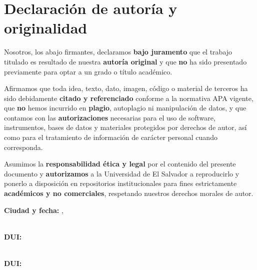\chapter*{Declaración de autoría y originalidad}

Nosotros, los abajo firmantes, declaramos \textbf{bajo juramento} que el trabajo titulado
\textit{\UEStitle} es resultado de nuestra \textbf{autoría original} y que \textbf{no} ha sido
presentado previamente para optar a un grado o título académico.

Afirmamos que toda idea, texto, dato, imagen, código o material de terceros ha sido
debidamente \textbf{citado y referenciado} conforme a la normativa APA vigente, que \textbf{no}
hemos incurrido en \textbf{plagio}, autoplagio ni manipulación de datos, y que contamos con las
\textbf{autorizaciones} necesarias para el uso de software, instrumentos, bases de datos y
materiales protegidos por derechos de autor, así como para el tratamiento de información de
carácter personal cuando corresponda.

Asumimos la \textbf{responsabilidad ética y legal} por el contenido del presente documento y
\textbf{autorizamos} a la Universidad de El Salvador a reproducirlo y ponerlo a disposición en
repositorios institucionales para fines estrictamente \textbf{académicos y no comerciales},
respetando nuestros derechos morales de autor.

\vspace{1.0cm}
\noindent \textbf{Ciudad y fecha:} \UEScity, \UESmonthyear


\if\relax\detokenize{\UESauthori}\relax\else
\vspace{1.0cm}
\noindent\makebox[7.5cm]{\hrulefill}\hfill\makebox[6.5cm][l]{\hrulefill}\\[-0.1cm]
\noindent\textbf{\UESauthori}\hfill \textbf{DUI:} \hspace{4.2cm}
\fi

\if\relax\detokenize{\UESauthorii}\relax\else
\vspace{1.0cm}
\noindent\makebox[7.5cm]{\hrulefill}\hfill\makebox[6.5cm][l]{\hrulefill}\\[-0.1cm]
\noindent\textbf{\UESauthorii}\hfill \textbf{DUI:} \hspace{4.2cm}
\fi


